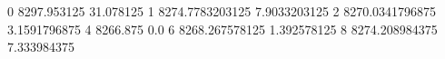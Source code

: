 0 8297.953125 31.078125
1 8274.7783203125 7.9033203125
2 8270.0341796875 3.1591796875
4 8266.875 0.0
6 8268.267578125 1.392578125
8 8274.208984375 7.333984375
